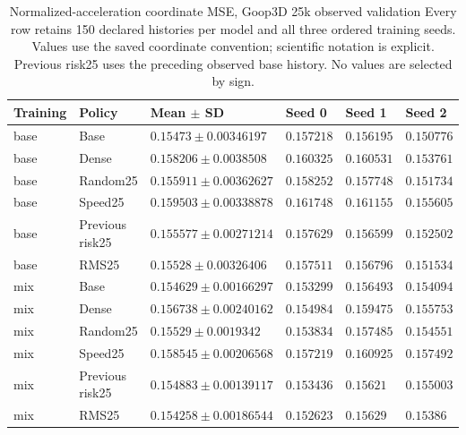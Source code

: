 \begin{table}[p]
\centering\scriptsize
\caption{Normalized-acceleration coordinate MSE, Goop3D 25k observed validation Every row retains 150 declared histories per model and all three ordered training seeds. Values use the saved coordinate convention; scientific notation is explicit. Previous risk25 uses the preceding observed base history. No values are selected by sign.}
\label{tab:goop3d25k-observed-normalized-validation}
\setlength{\tabcolsep}{3pt}
\begin{tabular}{llllll}
\toprule
Training & Policy & Mean $\pm$ SD & Seed 0 & Seed 1 & Seed 2\\
\midrule
base & Base & $0.15473\pm0.00346197$ & $0.157218$ & $0.156195$ & $0.150776$\\
base & Dense & $0.158206\pm0.0038508$ & $0.160325$ & $0.160531$ & $0.153761$\\
base & Random25 & $0.155911\pm0.00362627$ & $0.158252$ & $0.157748$ & $0.151734$\\
base & Speed25 & $0.159503\pm0.00338878$ & $0.161748$ & $0.161155$ & $0.155605$\\
base & Previous risk25 & $0.155577\pm0.00271214$ & $0.157629$ & $0.156599$ & $0.152502$\\
base & RMS25 & $0.15528\pm0.00326406$ & $0.157511$ & $0.156796$ & $0.151534$\\
mix & Base & $0.154629\pm0.00166297$ & $0.153299$ & $0.156493$ & $0.154094$\\
mix & Dense & $0.156738\pm0.00240162$ & $0.154984$ & $0.159475$ & $0.155753$\\
mix & Random25 & $0.15529\pm0.0019342$ & $0.153834$ & $0.157485$ & $0.154551$\\
mix & Speed25 & $0.158545\pm0.00206568$ & $0.157219$ & $0.160925$ & $0.157492$\\
mix & Previous risk25 & $0.154883\pm0.00139117$ & $0.153436$ & $0.15621$ & $0.155003$\\
mix & RMS25 & $0.154258\pm0.00186544$ & $0.152623$ & $0.15629$ & $0.15386$\\
\bottomrule
\end{tabular}
\end{table}

